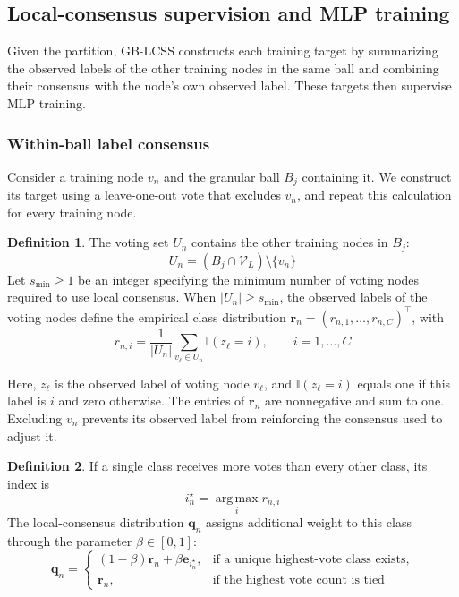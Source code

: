 \documentclass[10pt,letterpaper,nopreprintline]{elsarticle}
\theoremstyle{definition}
\newtheorem{definition}{Definition}
\theoremstyle{plain}
\begin{document}


\subsection{Local-consensus supervision and MLP training}\label{sec:3.3}

Given the partition, GB-LCSS constructs each training target by summarizing the observed labels of the other training nodes in the same ball and combining their consensus with the node's own observed label. These targets then supervise MLP training.

\subsubsection{Within-ball label consensus}\label{sec:3.3.1}

Consider a training node \(v_n\) and the granular ball \(B_j\) containing it. We construct its target using a leave-one-out vote that excludes \(v_n\), and repeat this calculation for every training node.

\begin{definition}
The voting set \(U_n\) contains the other training nodes in \(B_j\):
\begin{equation}\label{eq:7}
U_n=(B_j\cap\mathcal V_L)\setminus\{v_n\}
\end{equation}
Let \(s_{\min}\geq1\) be an integer specifying the minimum number of voting nodes required to use local consensus. When \(|U_n|\geq s_{\min}\), the observed labels of the voting nodes define the empirical class distribution \(\mathbf r_n=(r_{n,1},\ldots,r_{n,C})^\top\), with
\begin{equation}\label{eq:8}
r_{n,i}=\frac{1}{|U_n|}\sum_{v_\ell\in U_n}\mathbb I(z_\ell=i),
\qquad i=1,\ldots,C
\end{equation}
\end{definition}

Here, \(z_\ell\) is the observed label of voting node \(v_\ell\), and \(\mathbb I(z_\ell=i)\) equals one if this label is \(i\) and zero otherwise. The entries of \(\mathbf r_n\) are nonnegative and sum to one. Excluding \(v_n\) prevents its observed label from reinforcing the consensus used to adjust it.

\Needspace{64pt}
\begin{definition}
If a single class receives more votes than every other class, its index is
\begin{equation}\label{eq:9}
i_n^\star=\operatorname*{arg\,max}_i r_{n,i}
\end{equation}
The local-consensus distribution \(\mathbf q_n\) assigns additional weight to this class through the parameter \(\beta\in[0,1]\):
\begin{equation}\label{eq:10}
\mathbf q_n=
\begin{cases}
(1-\beta)\mathbf r_n+\beta\mathbf e_{i_n^\star},&\text{if a unique highest-vote class exists},\\
\mathbf r_n,&\text{if the highest vote count is tied}
\end{cases}
\end{equation}
\end{definition}
\end{document}

